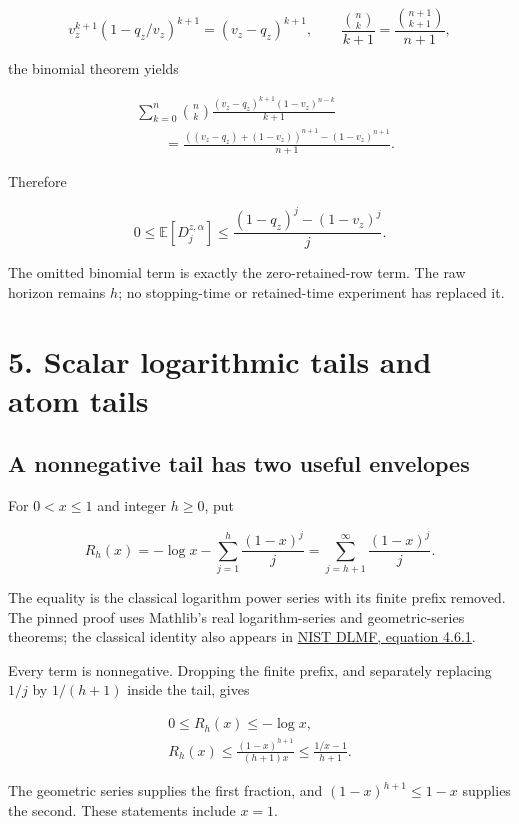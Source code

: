 \documentclass[11pt,a4paper]{article}
\begin{document}
\[
v_z^{k+1}(1-q_z/v_z)^{k+1}=(v_z-q_z)^{k+1},
\qquad
\frac{\binom nk}{k+1}=\frac{\binom{n+1}{k+1}}{n+1},
\]

the binomial theorem yields

\[
\begin{aligned}
&\sum_{k=0}^{n}\binom nk
 \frac{(v_z-q_z)^{k+1}(1-v_z)^{n-k}}{k+1}\\
&\qquad=\frac{((v_z-q_z)+(1-v_z))^{n+1}-(1-v_z)^{n+1}}{n+1}.
\end{aligned}
\]

Therefore

\[
0\le\mathbb E[D_j^{z,\alpha}]
\le\frac{(1-q_z)^j-(1-v_z)^j}{j}. \tag{13}
\]

The omitted binomial term is exactly the zero-retained-row term. The raw horizon remains \(h\); no stopping-time or retained-time experiment has replaced it.

\section{5. Scalar logarithmic tails and atom tails}\label{scalar-logarithmic-tails-and-atom-tails}

\subsection{A nonnegative tail has two useful envelopes}\label{a-nonnegative-tail-has-two-useful-envelopes}

For \(0<x\le1\) and integer \(h\ge0\), put

\[
R_h(x)=-\log x-\sum_{j=1}^{h}\frac{(1-x)^j}{j}
      =\sum_{j=h+1}^{\infty}\frac{(1-x)^j}{j}. \tag{14}
\]

The equality is the classical logarithm power series with its finite prefix removed. The pinned proof uses Mathlib's real logarithm-series and geometric-series theorems; the classical identity also appears in \href{https://dlmf.nist.gov/4.6.E1}{NIST DLMF, equation 4.6.1}.

Every term is nonnegative. Dropping the finite prefix, and separately replacing \(1/j\) by \(1/(h+1)\) inside the tail, gives

\[
\begin{gathered}
0\le R_h(x)\le-\log x,\\
R_h(x)\le\frac{(1-x)^{h+1}}{(h+1)x}
       \le\frac{1/x-1}{h+1}.
\end{gathered} \tag{15}
\]

The geometric series supplies the first fraction, and \((1-x)^{h+1}\le1-x\) supplies the second. These statements include \(x=1\).
\end{document}
